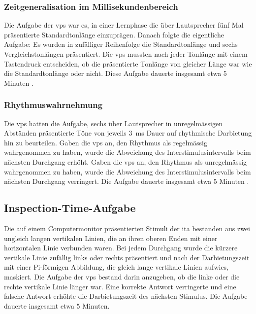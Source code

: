 \documentclass[11pt, twoside, a4paper]{book}		%
\begin{document}
\subsubsection*{Zeitgeneralisation im Millisekundenbereich}

Die Aufgabe der \glspl{vp} war es, in einer Lernphase die über Lautsprecher fünf Mal präsentierte Standardtonlänge einzuprägen. Danach folgte die eigentliche Aufgabe: Es wurden in zufälliger Reihenfolge die Standardtonlänge und sechs Vergleichstonlängen präsentiert. Die \glspl{vp} mussten nach jeder Tonlänge mit einem Tastendruck entscheiden, ob die präsentierte Tonlänge von gleicher Länge war wie die Standardtonlänge oder nicht. Diese Aufgabe dauerte insgesamt etwa $5$ Minuten \citep[in Anlehnung an][]{Stauffer2011}.

\subsubsection*{Rhythmuswahrnehmung}

Die \glspl{vp} hatten die Aufgabe, sechs über Lautsprecher in unregelmässigen Abständen präsentierte Töne von jeweils $3$~ms Dauer auf rhythmische Darbietung hin zu beurteilen. 
Gaben die \glspl{vp} an, den Rhythmus als regelmässig wahrgenommen zu haben, wurde die Abweichung des Interstimulusintervalls beim nächsten Durchgang erhöht. Gaben die \glspl{vp} an, den Rhythmus als unregelmässig wahrgenommen zu haben, wurde die Abweichung des Interstimulusintervalls beim nächsten Durchgang verringert.
Die Aufgabe dauerte insgesamt etwa $5$ Minuten \citep[siehe][]{Stauffer2011}.

\subsection{Inspection-Time-Aufgabe}

Die auf einem Computermonitor präsentierten Stimuli der \gls{ita} \citep{Vickers1972} bestanden aus zwei ungleich langen vertikalen Linien, die an ihren oberen Enden mit einer horizontalen Linie verbunden waren. Bei jedem Durchgang wurde die kürzere vertikale Linie zufällig links oder rechts präsentiert und nach der Darbietungszeit mit einer Pi-förmigen Abbildung, die gleich lange vertikale Linien aufwies, maskiert. Die Aufgabe der \glspl{vp} bestand darin anzugeben, ob die linke oder die rechte vertikale Linie länger war. Eine korrekte Antwort verringerte und eine falsche Antwort erhöhte die Darbietungszeit des nächsten Stimulus. Die Aufgabe dauerte insgesamt etwa $5$ Minuten.
\end{document}
